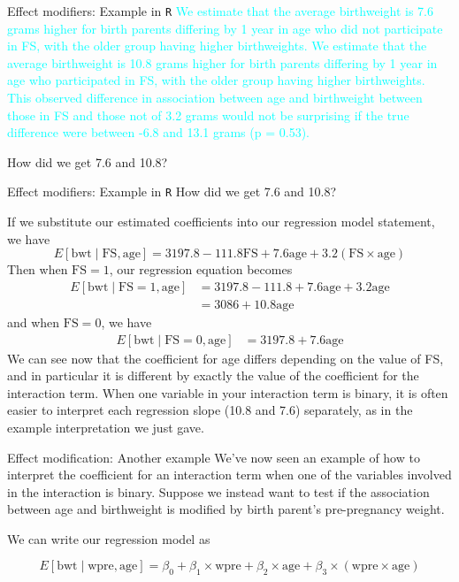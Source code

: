 \documentclass[10pt,t]{beamer}
\begin{document}
\begin{frame}{Effect modifiers: Example in \texttt{R}}
\textcolor{cyan}{We estimate that the average birthweight is 7.6 grams higher for birth parents differing by 1 year in age who did not participate in FS, with the older group having higher birthweights. We estimate that the average birthweight is 10.8 grams higher for birth parents differing by 1 year in age who participated in FS, with the older group having higher birthweights. This observed difference in association between age and birthweight between those in FS and those not of 3.2 grams would not be surprising if the true difference were between -6.8 and 13.1 grams (p = 0.53).}

\vspace{0.3cm}

How did we get 7.6 and 10.8?
\end{frame}

\begin{frame}{Effect modifiers: Example in \texttt{R}}
How did we get 7.6 and 10.8?

\vspace{0.3cm} If we substitute our estimated coefficients into our regression model statement, we have
$$
E[\text{bwt} \mid \text{FS}, \text{age}] = 3197.8 - 111.8 \text{FS} + 7.6 \text{age} + 3.2 (\text{FS} \times \text{age}) 
$$
\pause Then when $\text{FS} = 1$, our regression equation becomes
\begin{align*}
E[\text{bwt} \mid \text{FS} = 1, \text{age}] & = 3197.8 - 111.8  + 7.6 \text{age} + 3.2 \text{age} \\
& = 3086 + 10.8 \text{age}
\end{align*} \pause
and when $\text{FS} = 0$, we have
\begin{align*}
E[\text{bwt} \mid \text{FS} = 0, \text{age}] & = 3197.8  + 7.6 \text{age} 
\end{align*} \pause
\small We can see now that the coefficient for age differs depending on the value of FS, and in particular it is different by exactly the value of the coefficient for the interaction term. When one variable in your interaction term is binary, it is often easier to interpret each regression slope (10.8 and 7.6) separately, as in the example interpretation we just gave.

\end{frame}

\begin{frame}{Effect modification: Another example}
We've now seen an example of how to interpret the coefficient for an interaction term when one of the variables involved in the interaction is binary. Suppose we instead want to test if the association between age and birthweight is modified by birth parent's pre-pregnancy weight. 

\vspace{0.3cm}

We can write our regression model as

$$
E[\text{bwt} \mid \text{wpre}, \text{age}] = \beta_0 + \beta_1 \times \text{wpre} + \beta_2 \times \text{age} + \beta_3 \times (\text{wpre} \times \text{age})
$$
\end{frame}
\end{document}
